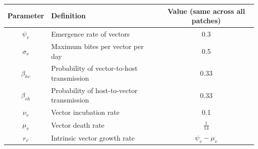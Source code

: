\begin{table}[!htbp]
    \centering
    \begin{adjustbox}{center}
        \begin{tabular}{clc} \toprule
            {Parameter} & {Definition} & {Value (same across all patches)} \\ \midrule
            $\psi_v$ & Emergence rate of vectors & 0.3 \\
            $\sigma_v$ & Maximum bites per vector per day & 0.5 \\
            $\beta_{hv}$ & Probability of vector-to-host transmission & 0.33 \\
            $\beta_{vh}$ & Probability of host-to-vector transmission & 0.33 \\
            $\nu_v$ & Vector incubation rate & 0.1 \\
            $\mu_v$ & Vector death rate & $\frac{1}{14}$ \\
            $r_v$ & Intrinsic vector growth rate & $\psi_v - \mu_v$ \\
            \bottomrule
        \end{tabular}
    \end{adjustbox}
    \label{table:manore-validation-constants}
\end{table}

